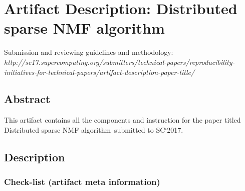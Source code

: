 \documentclass[sigconf, review=false]{acmart}
\newcommand{\distspnmffull}{Distributed sparse NMF algorithm}
\begin{document}




\appendix
\section{Artifact Description: \distspnmffull}

Submission and reviewing guidelines and methodology: \\
{\small\em http://sc17.supercomputing.org/submitters/technical-papers/reproducibility-initiatives-for-technical-papers/artifact-description-paper-title/}

\subsection{Abstract}

This artifact contains all the components and instruction for the paper titled \distspnmffull\ submitted to SC`2017. 

\subsection{Description}

\subsubsection{Check-list (artifact meta information)}
\end{document}
